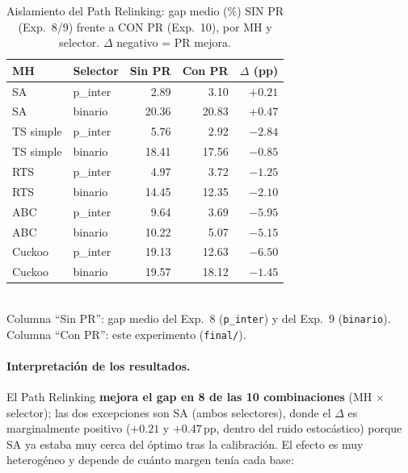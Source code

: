 \begin{table}[h]
\centering
\caption{Aislamiento del Path Relinking: gap medio (\%) SIN PR (Exp.~8/9)
         frente a CON PR (Exp.~10), por MH y selector. $\Delta$ negativo = PR
         mejora.}
\label{tab:pr-aislado-delta}
\small
\begin{tabular}{llrrr}
\toprule
MH & Selector & Sin PR & Con PR & $\Delta$ (pp) \\
\midrule
SA        & p\_inter & 2.89  & 3.10  & $+0.21$ \\
SA        & binario  & 20.36 & 20.83 & $+0.47$ \\
TS simple & p\_inter & 5.76  & 2.92  & $\mathbf{-2.84}$ \\
TS simple & binario  & 18.41 & 17.56 & $-0.85$ \\
RTS       & p\_inter & 4.97  & 3.72  & $-1.25$ \\
RTS       & binario  & 14.45 & 12.35 & $-2.10$ \\
ABC       & p\_inter & 9.64  & 3.69  & $\mathbf{-5.95}$ \\
ABC       & binario  & 10.22 & 5.07  & $\mathbf{-5.15}$ \\
Cuckoo    & p\_inter & 19.13 & 12.63 & $\mathbf{-6.50}$ \\
Cuckoo    & binario  & 19.57 & 18.12 & $-1.45$ \\
\bottomrule
\end{tabular}
\\[4pt]
\footnotesize
Columna ``Sin PR'': gap medio del Exp.~8 (\texttt{p\_inter}) y del Exp.~9
(\texttt{binario}). Columna ``Con PR'': este experimento (\texttt{final/}).
\end{table}

\paragraph{Interpretación de los resultados.}
El Path Relinking \textbf{mejora el gap en 8 de las 10 combinaciones}
(MH $\times$ selector); las dos excepciones son SA (ambos selectores), donde el
$\Delta$ es marginalmente positivo ($+0.21$ y $+0.47$\,pp, dentro del ruido
estocástico) porque SA ya estaba muy cerca del óptimo tras la calibración. El
efecto es muy heterogéneo y depende de cuánto margen tenía cada base:

